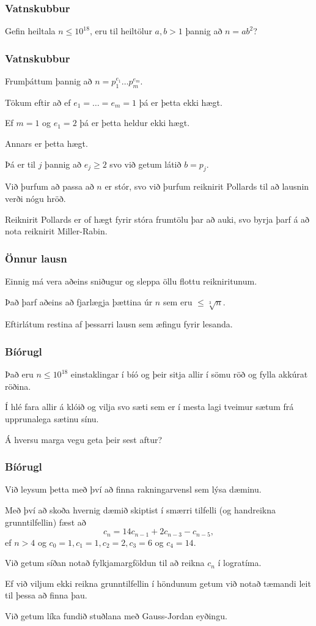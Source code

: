 {
	\frametitle{Vatnskubbur}
	{
		\item<1-> Gefin heiltala $n \leq 10^{18}$, eru til heiltölur $a, b > 1$ þannig að $n = ab^2$?
	}
}

{
	\frametitle{Vatnskubbur}
	{
		\item<1-> Frumþáttum þannig að $n = p_1^{e_1} \dots p_m^{e_m}$.
		\item<2-> Tökum eftir að ef $e_1 = \dots = e_m = 1$ þá er þetta ekki hægt.
		\item<3-> Ef $m = 1$ og $e_1 = 2$ þá er þetta heldur ekki hægt.
		\item<4-> Annars er þetta hægt.
		\item<5-> Þá er til $j$ þannig að $e_j \geq 2$ svo við getum látið $b = p_j$.
		\item<6-> Við þurfum að passa að $n$ er stór, svo við þurfum reiknirit Pollards til að lausnin verði nógu hröð.
        \item<7-> Reiknirit Pollards er of hægt fyrir stóra frumtölu þar að auki, svo byrja þarf á að nota reiknirit Miller-Rabin.
	}
}

{
    \frametitle{Önnur lausn}
    {
        \item<1-> Einnig má vera aðeins sniðugur og sleppa öllu flottu reikniritunum.
        \item<2-> Það þarf aðeins að fjarlægja þættina úr $n$ sem eru $\leq \sqrt[3]{n}$.
        \item<3-> Eftirlátum restina af þessarri lausn sem æfingu fyrir lesanda.
    }
}

{
	\frametitle{Bíórugl}
	{
		\item<1-> Það eru $n \leq 10^{18}$ einstaklingar í bíó og þeir sitja allir í sömu röð og fylla akkúrat röðina.
		\item<2-> Í hlé fara allir á klóið og vilja svo sæti sem er í mesta lagi tveimur sætum frá upprunalega sætinu sínu.
		\item<3-> Á hversu marga vegu geta þeir sest aftur?
	}
}

{
	\frametitle{Bíórugl}
	{
		\item<1-> Við leysum þetta með því að finna rakningarvensl sem lýsa dæminu.
		\item<2-> Með því að skoða hvernig dæmið skiptist í smærri tilfelli (og handreikna grunntilfellin) fæst að
		\[
			c_n = 14c_{n - 1} + 2c_{n - 3} - c_{n - 5},
		\]
		ef $n > 4$ og $c_0 = 1, c_1 = 1, c_2 = 2, c_3 = 6$ og $c_4 = 14$.
		\item<3-> Við getum síðan notað fylkjamargföldun til að reikna $c_n$ í logratíma.
		\item<4-> Ef við viljum ekki reikna grunntilfellin í höndunum getum við notað tæmandi leit til þessa að finna þau.
		\item<5-> Við getum líka fundið stuðlana með Gauss-Jordan eyðingu.
	}
}


